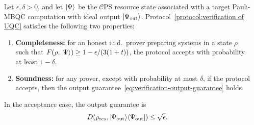 \documentclass[a4paper,twocolumn,11pt,unpublished]{quantumarticle}
\newcommand{\mCEPS}{\mathcal{C}\text{PS}}
\newcommand{\ketbra}[1]{\ket{#1}\!\bra{#1}}
\begin{document}
\begin{theorem}
    Let $\epsilon,\delta>0$, and let $\ket{\Psi}$ be the $\mCEPS$ resource state associated with a target Pauli-MBQC computation with ideal output $\ket{\Psi_{\rm out}}$. Protocol~\ref{protocol:verification of UQC} satisfies the following two properties:
    \begin{enumerate}
        \item \textbf{Completeness:} for an honest i.i.d.\ prover preparing systems in a state $\rho$ such that $F(\rho,\ket{\Psi})\geq 1-\epsilon/(3(1+t))$, the protocol accepts with probability at least $1-\delta$.

        \item \textbf{Soundness:} for any prover, except with probability at most $\delta$, if the protocol accepts, then the output guarantee~\eqref{eq:verification-output-guarantee} holds.
    \end{enumerate}
    In the acceptance case, the output guarantee is
    \begin{equation}
        \label{eq:verification-output-guarantee}
        D(\rho_{\mathrm{res}},\ketbra{\Psi_{\rm out}})\leq \sqrt{\epsilon}.
    \end{equation}
\end{theorem}
\end{document}
